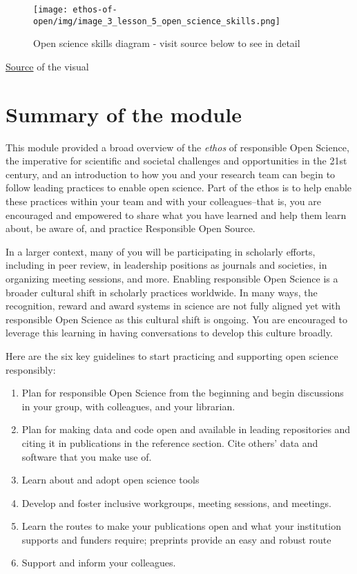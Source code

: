 \documentclass[
  letterpaper,
  DIV=11,
  numbers=noendperiod]{scrreport}
\providecommand{\tightlist}{%
  \setlength{\itemsep}{0pt}\setlength{\parskip}{0pt}}\usepackage{longtable,booktabs,array}
\begin{document}
\begin{figure}

{\centering \texttt{[image: ethos-of-open/img/image\_3\_lesson\_5\_open\_science\_skills.png]}

}

\caption{Open science skills diagram - visit source below to see in
detail}

\end{figure}

\href{https://doi.org/10.5281/zenodo.3702401}{Source} of the visual

\hypertarget{summary-of-the-module}{%
\section{Summary of the module}\label{summary-of-the-module}}

This module provided a broad overview of the \emph{ethos} of responsible
Open Science, the imperative for scientific and societal challenges and
opportunities in the 21st century, and an introduction to how you and
your research team can begin to follow leading practices to enable open
science. Part of the ethos is to help enable these practices within your
team and with your colleagues--that is, you are encouraged and empowered
to share what you have learned and help them learn about, be aware of,
and practice Responsible Open Source.

In a larger context, many of you will be participating in scholarly
efforts, including in peer review, in leadership positions as journals
and societies, in organizing meeting sessions, and more. Enabling
responsible Open Science is a broader cultural shift in scholarly
practices worldwide. In many ways, the recognition, reward and award
systems in science are not fully aligned yet with responsible Open
Science as this cultural shift is ongoing. You are encouraged to
leverage this learning in having conversations to develop this culture
broadly.

Here are the six key guidelines to start practicing and supporting open
science responsibly:

\begin{enumerate}
\def\labelenumi{\arabic{enumi}.}
\tightlist
\item
  Plan for responsible Open Science from the beginning and begin
  discussions in your group, with colleagues, and your librarian.
\item
  Plan for making data and code open and available in leading
  repositories and citing it in publications in the reference section.
  Cite others' data and software that you make use of.
\item
  Learn about and adopt open science tools
\item
  Develop and foster inclusive workgroups, meeting sessions, and
  meetings.
\item
  Learn the routes to make your publications open and what your
  institution supports and funders require; preprints provide an easy
  and robust route
\item
  Support and inform your colleagues.
\end{enumerate}
\end{document}

